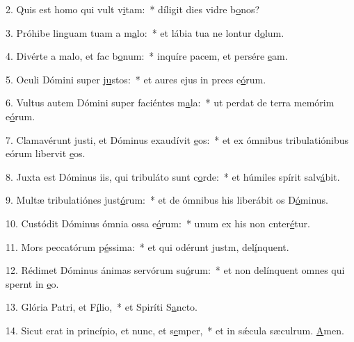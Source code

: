 2. Quis est homo qui vult v\uline{i}tam:~* díligit dies vidre b\uline{o}nos?\par 
3. Próhibe linguam tuam a m\uline{a}lo:~* et lábia tua ne lontur d\uline{o}lum.\par 
4. Divérte a malo, et fac b\uline{o}num:~* inquíre pacem, et persére \uline{e}am.\par 
5. Oculi Dómini super j\uline{u}stos:~* et aures ejus in precs e\uline{ó}rum.\par 
6. Vultus autem Dómini super faciéntes m\uline{a}la:~* ut perdat de terra memórim e\uline{ó}rum.\par 
7. Clamavérunt justi, et Dóminus exaudívit \uline{e}os:~* et ex ómnibus tribulatiónibus eórum libervit \uline{e}os.\par 
8. Juxta est Dóminus iis, qui tribuláto sunt c\uline{o}rde:~* et húmiles spírit salv\uline{á}bit.\par 
9. Multæ tribulatiónes just\uline{ó}rum:~* et de ómnibus his liberábit os D\uline{ó}minus.\par 
10. Custódit Dóminus ómnia ossa e\uline{ó}rum:~* unum ex his non cnter\uline{é}tur.\par 
11. Mors peccatórum p\uline{é}ssima:~* et qui odérunt justm, del\uline{í}nquent.\par 
12. Rédimet Dóminus ánimas servórum su\uline{ó}rum:~* et non delínquent omnes qui spernt in \uline{e}o.\par 
13. Glória Patri, et F\uline{í}lio,~* et Spiríti S\uline{a}ncto.\par 
14. Sicut erat in princípio, et nunc, et s\uline{e}mper,~* et in sǽcula sæculrum. \uline{A}men.\par 
